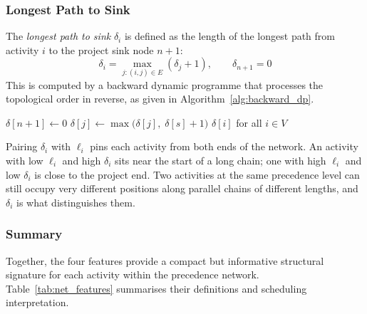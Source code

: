 \subsubsection*{Longest Path to Sink}
\label{subsubsec:longest_path_sink}
The \textit{longest path to sink} $\delta_i$ is defined as the
length of the longest path from activity $i$ to the project sink
node $n+1$:
\begin{equation}
    \delta_i = \max_{j : (i,j) \in E} (\delta_j + 1),
    \qquad \delta_{n+1} = 0
    \label{eq:longest_path_sink}
\end{equation}
This is computed by a backward dynamic programme that processes
the topological order in reverse, as given in
Algorithm~\ref{alg:backward_dp}.

\begin{algorithm}[ht]
\caption{Backward longest-path DP for depth to sink}
\label{alg:backward_dp}
\begin{algorithmic}[1]
\State $\delta[n+1] \leftarrow 0$
        \State $\delta[j] \leftarrow
               \max\bigl(\delta[j],\; \delta[s] + 1\bigr)$
    \EndFor
\EndFor
\State \Return $\delta[i]$ for all $i \in V$
\end{algorithmic}
\end{algorithm}

Pairing $\delta_i$ with $\ell_i$ pins each activity from both
ends of the network. An activity with low $\ell_i$ and high
$\delta_i$ sits near the start of a long chain; one with high
$\ell_i$ and low $\delta_i$ is close to the project end. Two
activities at the same precedence level can still occupy very
different positions along parallel chains of different lengths,
and $\delta_i$ is what distinguishes them.

\subsubsection*{Summary}

Together, the four features provide a compact but informative
structural signature for each activity within the precedence
network. Table~\ref{tab:net_features} summarises their
definitions and scheduling interpretation.

